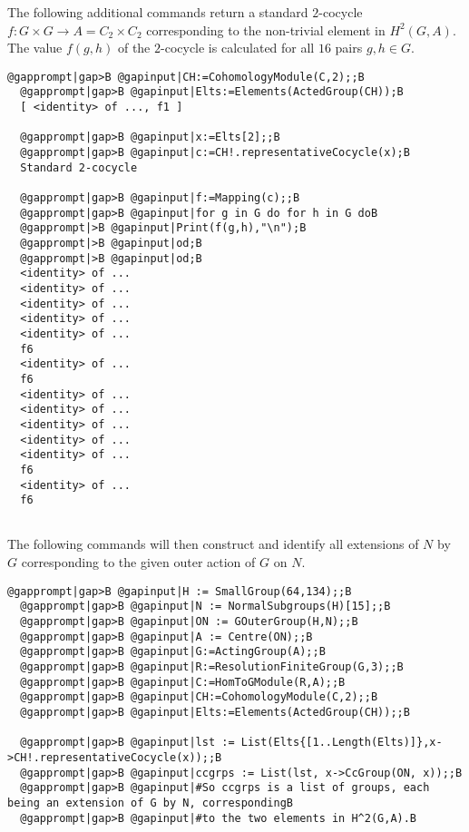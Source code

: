\documentclass[a4paper,11pt]{report}
\begin{document}
{{\begin{Verbatim}[commandchars=!@|,fontsize=\small,frame=single,label=Example]
\end{Verbatim}
 

The following additional commands return a standard $2$-cocycle $f:G\times G\rightarrow A =C_2\times C_2$ corresponding to the non-trivial element in $H^2(G,A)$. The value $f(g,h)$ of the $2$-cocycle is calculated for all $16$ pairs $g,h \in G$. 
\begin{Verbatim}[commandchars=@|B,fontsize=\small,frame=single,label=Example]
  @gapprompt|gap>B @gapinput|CH:=CohomologyModule(C,2);;B
  @gapprompt|gap>B @gapinput|Elts:=Elements(ActedGroup(CH));B
  [ <identity> of ..., f1 ]
  
  @gapprompt|gap>B @gapinput|x:=Elts[2];;B
  @gapprompt|gap>B @gapinput|c:=CH!.representativeCocycle(x);B
  Standard 2-cocycle 
  
  @gapprompt|gap>B @gapinput|f:=Mapping(c);;B
  @gapprompt|gap>B @gapinput|for g in G do for h in G doB
  @gapprompt|>B @gapinput|Print(f(g,h),"\n");B
  @gapprompt|>B @gapinput|od;B
  @gapprompt|>B @gapinput|od;B
  <identity> of ...
  <identity> of ...
  <identity> of ...
  <identity> of ...
  <identity> of ...
  f6
  <identity> of ...
  f6
  <identity> of ...
  <identity> of ...
  <identity> of ...
  <identity> of ...
  <identity> of ...
  f6
  <identity> of ...
  f6
  
\end{Verbatim}
 

The following commands will then construct and identify all extensions of $N$ by $G$ corresponding to the given outer action of $G$ on $N$. 
\begin{Verbatim}[commandchars=@|B,fontsize=\small,frame=single,label=Example]
  @gapprompt|gap>B @gapinput|H := SmallGroup(64,134);;B
  @gapprompt|gap>B @gapinput|N := NormalSubgroups(H)[15];;B
  @gapprompt|gap>B @gapinput|ON := GOuterGroup(H,N);;B
  @gapprompt|gap>B @gapinput|A := Centre(ON);;B
  @gapprompt|gap>B @gapinput|G:=ActingGroup(A);;B
  @gapprompt|gap>B @gapinput|R:=ResolutionFiniteGroup(G,3);;B
  @gapprompt|gap>B @gapinput|C:=HomToGModule(R,A);;B
  @gapprompt|gap>B @gapinput|CH:=CohomologyModule(C,2);;B
  @gapprompt|gap>B @gapinput|Elts:=Elements(ActedGroup(CH));;B
  
  @gapprompt|gap>B @gapinput|lst := List(Elts{[1..Length(Elts)]},x->CH!.representativeCocycle(x));;B
  @gapprompt|gap>B @gapinput|ccgrps := List(lst, x->CcGroup(ON, x));;B
  @gapprompt|gap>B @gapinput|#So ccgrps is a list of groups, each being an extension of G by N, correspondingB
  @gapprompt|gap>B @gapinput|#to the two elements in H^2(G,A).B
  

\end{Verbatim}}}
\end{document}
